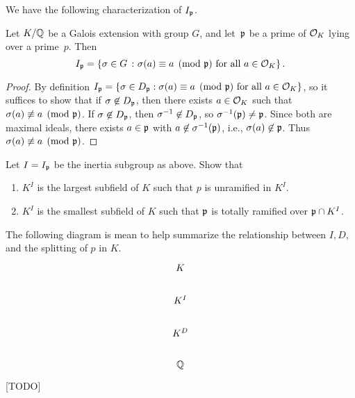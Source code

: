 We have the following characterization of $I_{\mathfrak{p}}$.
\begin{proposition}\label{prop:charip}
	Let $K/\mathbb{Q}$ be a Galois extension with group $G$,
	and let~$\mathfrak{p}$ be a prime of $\mathcal{O}_K$ lying
	over a prime~$p$.  Then
	$$
		I_{\mathfrak{p}} = \left\{
		\sigma\in G \ \colon \sigma(a) \equiv a\pmod{\mathfrak{p}}\text{ for all } a\in\mathcal{O}_K
		\right\}.
	$$
\end{proposition}
\begin{proof}
	By definition $I_{\mathfrak{p}} = \{\sigma\in D_{\mathfrak{p}} : \sigma(a) \equiv
	a\pmod{\mathfrak{p}}\text{ for all } a\in\mathcal{O}_K\}$, so it suffices to show that
	if $\sigma\not\in D_{\mathfrak{p}}$, then there exists $a\in\mathcal{O}_K$ such that
	$\sigma(a)\not\equiv a\pmod{\mathfrak{p}}$.  If $\sigma\not\in D_{\mathfrak{p}}$, then
	$\sigma^{-1}\not\in D_{\mathfrak{p}}$, so $\sigma^{-1}(\mathfrak{p})\neq \mathfrak{p}$.  Since both
	are maximal ideals, there exists $a\in\mathfrak{p}$ with
	$a\not\in\sigma^{-1}(\mathfrak{p})$, i.e., $\sigma(a)\not\in\mathfrak{p}$.  Thus
	$\sigma(a)\not\equiv a\pmod{\mathfrak{p}}$.
\end{proof}

\begin{exercise}
	Let $I = I_{\mathfrak{p}}$ be the inertia subgroup as above. Show that
	\begin{enumerate}
		\item $K^I$ is the largest subfield of $K$ such that $p$ is unramified
		in $K^I$.
		\item $K^I$ is the smallest subfield of $K$ such that $\mathfrak{p}$ is totally
		ramified over $\mathfrak{p} \cap K^I$.
	\end{enumerate}
\end{exercise}

The following diagram is mean to help summarize the relationship between $I,D$,
and the splitting of $p$ in $K$.
$$
	\begin{tikzcd}
		K \\
		K^I \\
		K^D \\
		\Q
	\end{tikzcd}
$$
[TODO]
%		


